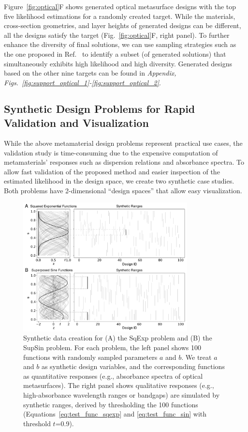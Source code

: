 \documentclass{article}
\begin{document}
Figure~\ref{fig:optical}F shows generated optical metasurface designs with the top five likelihood estimations for a randomly created target. While the materials, cross-section geometries, and layer heights of generated designs can be different, all the designs satisfy the target (Fig.~\ref{fig:optical}F, right panel). To further enhance the diversity of final solutions, we can use sampling strategies such as the one proposed in Ref.~\cite{chan2021metaset,lee2023t} to identify a subset (of generated solutions) that simultaneously exhibits high likelihood and high diversity. Generated designs based on the other nine targets can be found in \textit{Appendix, Figs.~\ref{fig:support_optical_1}-\ref{fig:support_optical_2}}.




\subsection{Synthetic Design Problems for Rapid Validation and Visualization}
\label{sec:synthetic}

While the above metamaterial design problems represent practical use cases, the validation study is time-consuming due to the expensive computation of metamaterials' responses such as dispersion relations and absorbance spectra. To allow fast validation of the proposed method and easier inspection of the estimated likelihood in the design space, we create two synthetic case studies. Both problems have 2-dimensional ``design spaces'' that allow easy visualization.

\begin{figure}[h]
\centering
\includegraphics[width=0.8\textwidth]{fig/synthetic_data.pdf}
\caption{Synthetic data creation for (A) the SqExp problem and (B) the SupSin problem. For each problem, the left panel shows 100 functions with randomly sampled parameters $a$ and $b$. We treat $a$ and $b$ as synthetic design variables, and the corresponding functions as quantitative responses (e.g., absorbance spectra of optical metasurfaces). The right panel shows qualitative responses (e.g., high-absorbance wavelength ranges or bandgaps) are simulated by synthetic ranges, derived by thresholding the 100 functions (Equations~\ref{eq:test_func_sqexp} and \ref{eq:test_func_sin} with threshold $t$=0.9).}
\label{fig:synthetic_data}
\end{figure}
\end{document}
